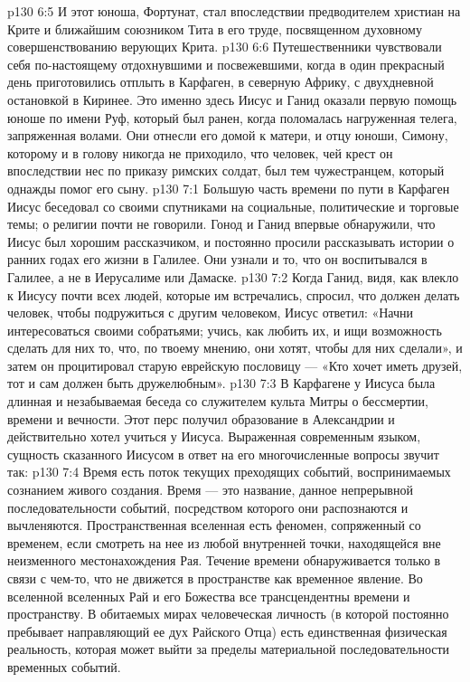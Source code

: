 \vs p130 6:5 И этот юноша, Фортунат, стал впоследствии предводителем христиан на Крите и ближайшим союзником Тита в его труде, посвященном духовному совершенствованию верующих Крита.
\vs p130 6:6 \pc Путешественники чувствовали себя по\hyp{}настоящему отдохнувшими и посвежевшими, когда в один прекрасный день приготовились отплыть в Карфаген, в северную Африку, с двухдневной остановкой в Киринее. Это именно здесь Иисус и Ганид оказали первую помощь юноше по имени Руф, который был ранен, когда поломалась нагруженная телега, запряженная волами. Они отнесли его домой к матери, и отцу юноши, Симону, которому и в голову никогда не приходило, что человек, чей крест он впоследствии нес по приказу римских солдат, был тем чужестранцем, который однажды помог его сыну.
\vs p130 7:1 Большую часть времени по пути в Карфаген Иисус беседовал со своими спутниками на социальные, политические и торговые темы; о религии почти не говорили. Гонод и Ганид впервые обнаружили, что Иисус был хорошим рассказчиком, и постоянно просили рассказывать истории о ранних годах его жизни в Галилее. Они узнали и то, что он воспитывался в Галилее, а не в Иерусалиме или Дамаске.
\vs p130 7:2 Когда Ганид, видя, как влекло к Иисусу почти всех людей, которые им встречались, спросил, что должен делать человек, чтобы подружиться с другим человеком, Иисус ответил: «Начни интересоваться своими собратьями; учись, как любить их, и ищи возможность сделать для них то, что, по твоему мнению, они хотят, чтобы для них сделали», и затем он процитировал старую еврейскую пословицу --- «Кто хочет иметь друзей, тот и сам должен быть дружелюбным».
\vs p130 7:3 В Карфагене у Иисуса была длинная и незабываемая беседа со служителем культа Митры о бессмертии, времени и вечности. Этот перс получил образование в Александрии и действительно хотел учиться у Иисуса. Выраженная современным языком, сущность сказанного Иисусом в ответ на его многочисленные вопросы звучит так:
\vs p130 7:4 \pc Время есть поток текущих преходящих событий, воспринимаемых сознанием живого создания. Время --- это название, данное непрерывной последовательности событий, посредством которого они распознаются и вычленяются. Пространственная вселенная есть феномен, сопряженный со временем, если смотреть на нее из любой внутренней точки, находящейся вне неизменного местонахождения Рая. Течение времени обнаруживается только в связи с чем\hyp{}то, что не движется в пространстве как временное явление. Во вселенной вселенных Рай и его Божества все трансцендентны времени и пространству. В обитаемых мирах человеческая личность (в которой постоянно пребывает направляющий ее дух Райского Отца) есть единственная физическая реальность, которая может выйти за пределы материальной последовательности временных событий.
